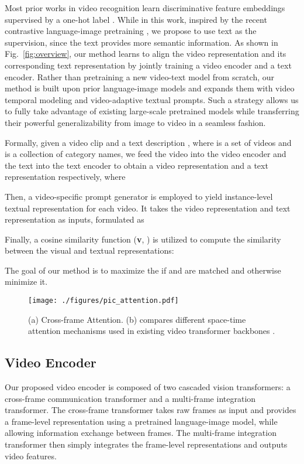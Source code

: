 \documentclass[runningheads]{llncs}
\begin{document}
Most prior works in video recognition learn discriminative feature embeddings supervised by a one-hot label \cite{arnab2021vivit,timesformer2021,feichtenhofer2019slowfast,wang2016tsn}. While in this work, inspired by the recent contrastive language-image pretraining \cite{clip,align,florence}, we propose to use text as the supervision, since the text provides more semantic information. As shown in Fig.~\ref{fig:overview}, our method learns to align the video representation and its corresponding text representation by jointly training a video encoder and a text encoder. Rather than pretraining a new video-text model from scratch, our method is built upon prior language-image models and expands them with video temporal modeling and video-adaptive textual prompts. Such a strategy allows us to fully take advantage of existing large-scale  pretrained models while transferring their powerful generalizability from image to video in a seamless fashion. 

Formally, given a video clip  and a text description , where  is a set of videos and  is a collection of category names, we feed the video  into the video encoder  and the text  into the text encoder  to obtain a video representation  and a text representation  respectively, where 

Then, a video-specific prompt generator  is employed to yield instance-level textual representation for each video. It takes the video representation  and text representation  as inputs, formulated as 

Finally, a cosine similarity function {}({\bf{v}}, {}) is utilized to compute the similarity between the visual and textual representations:


\noindent The goal of our method is to maximize the  if  and  are matched and otherwise minimize it. 

\begin{figure}[tb!]
\centering
\texttt{[image: ./figures/pic\_attention.pdf]}
\caption{ (a) Cross-frame Attention. (b) compares different space-time attention mechanisms used in existing video transformer backbones \cite{arnab2021vivit,timesformer2021,liu2021video}.}
\label{fig:attention}
\end{figure} \subsection{Video Encoder}\label{sec:encoder}

Our proposed video encoder is composed of two cascaded vision transformers: a cross-frame communication transformer and a multi-frame integration transformer. The cross-frame transformer takes raw frames as input and provides a frame-level representation using a pretrained language-image model, while allowing information exchange between frames. The multi-frame integration transformer then simply integrates the frame-level representations and outputs video features.
\end{document}
